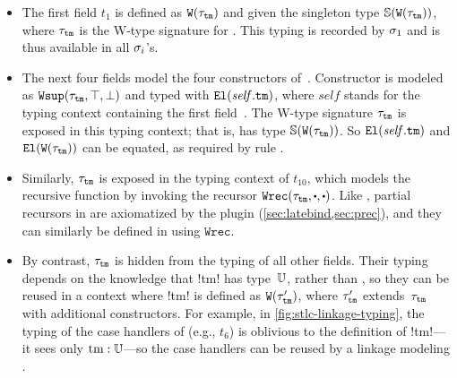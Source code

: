 \begin{itemize}
  [labelsep=*,leftmargin=1pc,itemsep=3pt]

\item 
The first field $t_1$ is defined as $\texttt{W}({\tau_{\texttt{tm}}})$
and given the singleton type $\mathbb{S}({\texttt{W}({\tau_{\texttt{tm}}})})$, where $\tau_{\texttt{tm}}$
is the W-type signature for .
This typing is recorded by $\sigma_1$ and is thus available in all $\sigma_i$'s.

\item 
The next four fields model the four constructors of~.
Constructor  is modeled as $\texttt{Wsup}({\tau_{\texttt{tm}}},{\top},{\bot})$
and typed with $\texttt{El}({\mathit{self}.\texttt{tm}})$, where $\mathit{self}$ stands for
the typing context containing the first field~.
The W-type signature $\tau_{\texttt{tm}}$ is exposed in
this typing context; that is,  has type $\mathbb{S}({\texttt{W}({\tau_{\texttt{tm}}})})$.
So $\texttt{El}({\mathit{self}.\texttt{tm}})$ and $\texttt{El}({\texttt{W}({\tau_{\texttt{tm}}})})$ can be equated,
as required by rule .

\item
Similarly, $\tau_{\texttt{tm}}$ is exposed in the typing context of
$t_{10}$, which models the recursive function  by invoking
the recursor $\Wrec{\wsig_{\texttt{tm}}}{\cDot}{\cDot}$.
%
Like , partial recursors in \Lang are axiomatized by the plugin
(\cref{sec:latebind,sec:prec}), and they can similarly be defined in \TT
using $\texttt{Wrec}$.

\item
By contrast, $\tau_{\texttt{tm}}$ is hidden from the typing of all other fields.
Their typing depends on the knowledge that \lsti!tm! has type~$\mathbb{U}$,
rather than ,
so they can be reused in a context where \lsti!tm! is defined as $\texttt{W}({\tau'_{\texttt{tm}}})$,
where $\tau'_{\texttt{tm}}$ extends~$\tau_{\texttt{tm}}$ with additional constructors.
%
For example, in \cref{fig:stlc-linkage-typing}, the typing of the case handlers of
 (e.g., $t_6$) is oblivious to the definition of \lsti!tm!---it sees only $\text{\lsti!tm!}:\cU$---so
the case handlers can be reused by a linkage modeling .

\end{itemize}


